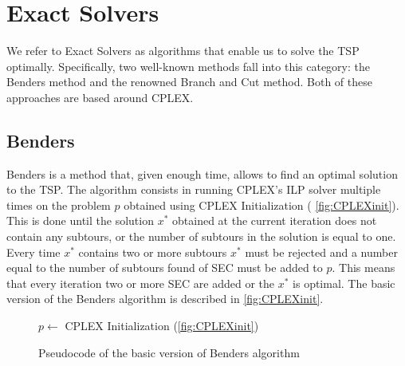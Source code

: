 \chapter{Exact Solvers}

We refer to Exact Solvers as algorithms that enable us to solve the TSP optimally.
Specifically, two well-known methods fall into this category: the Benders method and the renowned Branch and Cut method.
Both of these approaches are based around CPLEX.

\section{Benders}

Benders is a method that, given enough time, allows to find an optimal solution to the TSP.
The algorithm consists in running CPLEX's ILP solver multiple times on the problem $p$ obtained using CPLEX Initialization (\figurename{ \ref{fig:CPLEXinit}}).
This is done until the solution $x^*$ obtained at the current iteration does not contain any subtours, or the number of subtours in the solution is equal to one.
Every time $x^*$ contains two or more subtours $x^*$ must be rejected and a number equal to the number of subtours found of SEC must be added to $p$.
This means that every iteration two or more SEC are added or the $x^*$ is optimal.
The basic version of the Benders algorithm is described in \figurename{ \ref{fig:CPLEXinit}}.

\begin{figure}[htbp]
	\begin{algorithm}[H]
		\vspace{2mm}
		$p \gets$ CPLEX Initialization (\ref{fig:CPLEXinit})\\
	\end{algorithm}
	\caption{Pseudocode of the basic version of Benders algorithm} \label{fig:benders}
\end{figure}

